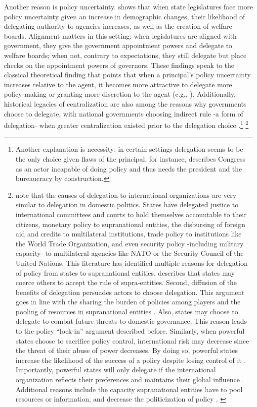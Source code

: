 \documentclass[12pt]{amsart}
\numberwithin{equation}{section}
\theoremstyle{definition}
\theoremstyle{definition}
\theoremstyle{definition}
\begin{document}
 Another reason is policy uncertainty. \citet{volden_2002} shows that when state legislatures face more policy uncertainty given an increase in demographic changes, their likelihood of delegating authority to agencies increases, as well as the creation of welfare boards. Alignment matters in this setting: when legislatures are aligned with government, they give the government appointment powers and delegate to welfare boards; when not, contrary to expectations, they still delegate but place checks on the appointment powers of governors. These findings speak to the classical theoretical finding that points that when a principal's policy uncertainty increases relative to the agent, it becomes more attractive to delegate more policy-making or granting more discretion to the agent (e.g., \citet{epstein_halloran_1994, epstein_halloran_1999, bawn_1995}). Additionally, historical legacies of centralization are also among the reasons why governments choose to delegate, with national governments choosing indirect rule -a form of delegation- when greater centralization existed prior to the delegation choice \citep{gerring_etal_2011}.\footnote{Another explanation is necessity: in certain settings delegation seems to be the only choice given flaws of the principal. \citet{huntington_1995} for instance, describes Congress as an actor incapable of doing policy and thus needs the president and the bureaucracy by construction.} \footnote{\citet{Hawkins_etal_2006} note that the causes of delegation to international organizations are very similar to delegation in domestic politics. States have delegated justice to international committees and courts to hold themselves accountable to their citizens, monetary policy to supranational entities, the disbursing of foreign aid and credits to multilateral institutions, trade policy to institutions like the World Trade Organization, and even security policy -including military capacity- to multilateral agencies like NATO or the Security Council of the United Nations. This literature has identified multiple reasons for delegation of policy from states to supranational entities. \citet{Moravcsik_2000} describes that states may coerce others to accept the rule of supra-entities. Second, diffusion of the benefits of delegation persuades actors to choose delegation. This argument goes in line with the sharing the burden of policies among players and the pooling of resources in supranational entities \citep{milner_2011}. Also, states may choose to delegate to combat future threats to domestic governance. This reason leads to the policy ``lock-in'' argument described before. Similarly, when powerful states choose to sacrifice policy control, international risk may decrease since the threat of their abuse of power decreases. By doing so, powerful states increase the likelihood of the success of a policy despite losing control of it \citep{lake_2009, milner_2011}. Importantly, powerful states will only delegate if the international organization reflects their preferences and maintains their global influence \citep{Hawkins_etal_2006}. Additional reasons include the capacity supranational entities have to pool resources or information, and decrease the politicization of policy \citet{Rodrick_1996}. \label{footnote:international_delegation}}
\end{document}

